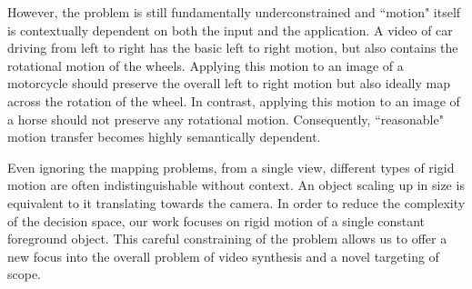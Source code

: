 However, the problem is still fundamentally underconstrained and ``motion" itself is contextually dependent on both the input and the application. A video of car driving from left to right has the basic left to right motion, but also contains the rotational motion of the wheels. Applying this motion to an image of a motorcycle should preserve the overall left to right motion but also ideally map across the rotation of the wheel. In contrast, applying this motion to an image of a horse should not preserve any rotational
motion. Consequently, ``reasonable" motion transfer becomes highly semantically dependent.

Even ignoring the mapping problems, from a single view, different types of rigid motion are often indistinguishable without context. An object scaling up in size is equivalent to it translating towards the camera. In order to reduce the complexity of the decision space, our work focuses on rigid motion of a single constant foreground object. This careful constraining of the problem allows us to offer a new focus into the overall problem of video synthesis and a novel targeting of scope.

